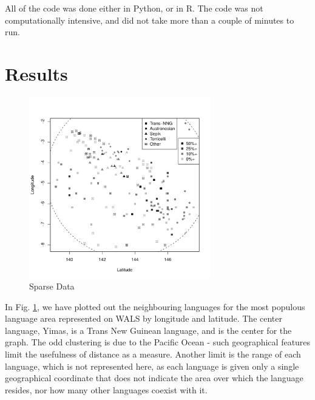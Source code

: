 \documentclass[11pt]{article}
\begin{document}

All of the code was done either in Python, or in R. %
The code was not computationally intensive, and did not take more than a couple of minutes to run.


\section{Results} %

\begin{figure}[h]
\includegraphics[width=3.1in]
{graph1.pdf} 
\caption{Sparse Data} 
\label{fig:sparse} 
\end{figure}

In Fig. \ref{fig:sparse}, we have plotted out the neighbouring languages for the most populous language area represented on WALS by longitude and latitude. The center language, Yimas, is a Trans New Guinean language, and is the center for the graph. The odd clustering is due to the Pacific Ocean - such geographical features limit the usefulness of distance as a measure. Another limit is the range of each language, which is not represented here, as each language is given only a single geographical coordinate that does not indicate the area over which the language resides, nor how many other languages coexist with it.
\end{document}
